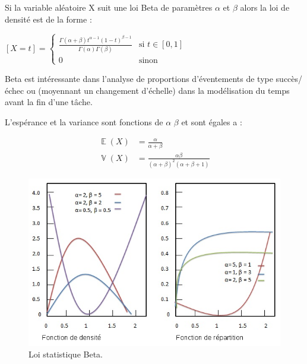 \documentclass[a4paper,12pt]{report}
\DeclareMathOperator{\E}{\mathbb{E}} %
\DeclareMathOperator{\V}{\mathbb{V}} %
\theoremstyle{plain}				%
\theoremstyle{definition}				%
\begin{document}

Si la variable aléatoire X suit une loi Beta de paramètres $\alpha$ et $\beta$ alors la loi de densité est de la forme :
  \begin{center}
  $[X=t] = \left\{
    \begin{array}{ll}
    \frac{\Gamma(\alpha + \beta) t^{\alpha-1} (1-t)^{\beta-1}}{\Gamma(\alpha) \Gamma(\beta)}
    & 
   	\mbox{si } t \in [0,1]  \\
        0 & 
        \mbox{sinon}
    \end{array}
	\right.$
  \label{definitionLoiBetaDensite}
  \end{center}

Beta est intéressante dans l'analyse de proportions d’éventements de type succès/échec ou 
(moyennant un changement d'échelle) dans la modélisation du temps avant la fin d'une tâche.

L’espérance et la variance sont fonctions de $\alpha$ $\beta$ et sont égales a :

\begin{align*}
	\E(X) &= \frac{\alpha}{\alpha + \beta} \\
	\V(X) &= \frac{\alpha \beta}{(\alpha + \beta)^2 (\alpha + \beta + 1)} 
\end{align*}

\begin{figure}
{\centering
\includegraphics[width=\columnwidth]{loiStatBeta.png}
\caption{Loi statistique Beta.}
\label{fig:LoiStatistiquesBeta}
\par}
\end{figure}
\end{document}
